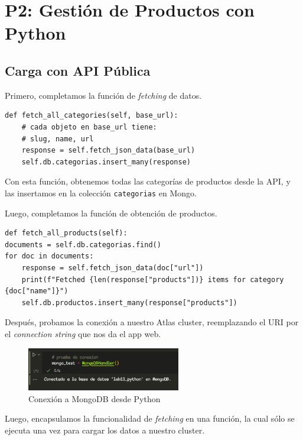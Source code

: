 \section{P2: Gestión de Productos con Python}

\subsection{Carga con API Pública}

Primero, completamos la función de \textit{fetching} de datos.

\begin{verbatim}
def fetch_all_categories(self, base_url):
    # cada objeto en base_url tiene:
    # slug, name, url
    response = self.fetch_json_data(base_url)
    self.db.categorias.insert_many(response)
\end{verbatim}

Con esta función, obtenemos todas las categorías de productos desde la API, y las
insertamos en la colección \texttt{categorias} en Mongo.

Luego, completamos la función de obtención de productos.

\begin{verbatim}
def fetch_all_products(self):
documents = self.db.categorias.find()
for doc in documents:
    response = self.fetch_json_data(doc["url"])
    print(f"Fetched {len(response["products"])} items for category {doc["name"]}")
    self.db.productos.insert_many(response["products"])
\end{verbatim}

Después, probamos la conexión a nuestro Atlas cluster, reemplazando el URI por el \textit{connection string}
que nos da el app web.

\begin{figure}[H]
    \centering
    \includegraphics[width=0.6\textwidth]{./p2_pruebaconexion.png}
    \caption{Conexión a MongoDB desde Python}\label{fig:pruebaconexion}
\end{figure}

Luego, encapsulamos la funcionalidad de \textit{fetching} en una función, la cual sólo se
ejecuta una vez para cargar los datos a nuestro cluster.

